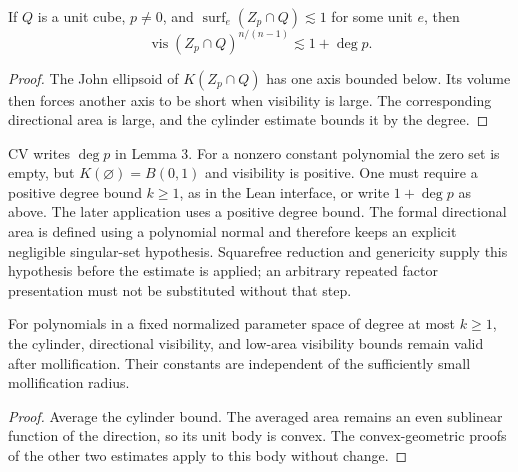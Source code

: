 \begin{lemma}
\label{lem:cv-degree}
If $Q$ is a unit cube, $p\ne0$, and
$\operatorname{surf}_e(Z_p\cap Q)\lesssim1$ for some unit $e$,
then
\[
             \operatorname{vis}(Z_p\cap Q)^{n/(n-1)}
                          \lesssim 1+\deg p.
\]
\end{lemma}
\begin{proof}
The John ellipsoid of $K(Z_p\cap Q)$ has one axis bounded below.
Its volume then forces another axis to be short when visibility is
large. The corresponding directional area is large, and the cylinder
estimate bounds it by the degree.
\end{proof}

\begin{remark}
\label{rem:cv-polynomial}
CV writes $\deg p$ in Lemma 3. For a nonzero constant polynomial the
zero set is empty, but $K(\varnothing)=B(0,1)$ and visibility is
positive. One must require a positive degree bound $k\geq1$, as in
the Lean interface, or write $1+\deg p$ as above. The later application
uses a positive degree bound. The formal directional area is defined
using a polynomial normal and therefore keeps an explicit negligible
singular-set hypothesis. Squarefree reduction and genericity supply
this hypothesis before the estimate is applied; an arbitrary repeated
factor presentation must not be substituted without that step.
\end{remark}

\begin{lemma}
\label{lem:cv-mollified}
For polynomials in a fixed normalized parameter space of degree at
most $k\geq1$, the cylinder, directional visibility, and low-area
visibility bounds remain valid after mollification. Their constants
are independent of the sufficiently small mollification radius.
\end{lemma}
\begin{proof}
Average the cylinder bound. The averaged area remains an even
sublinear function of the direction, so its unit body is convex.
The convex-geometric proofs of the other two estimates apply to this
body without change.
\end{proof}

